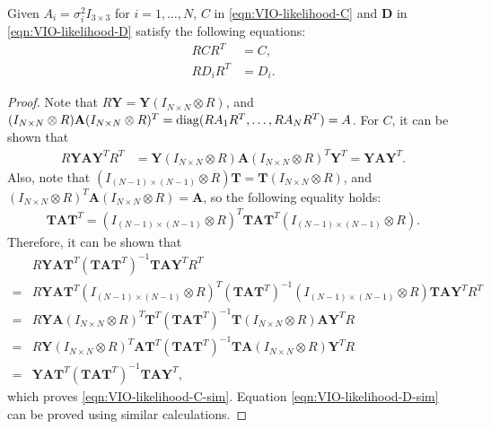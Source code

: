 \begin{lemma} \label{lemma:VIO-likelihood-CD}
	Given $A_i = \sigma_i^2I_{3\times 3}$ for $i=1,\ldots,N$, $C$ in \eqref{eqn:VIO-likelihood-C} and $\mathbf{D}$ in \eqref{eqn:VIO-likelihood-D} satisfy the following equations:
	\begin{align}
		RCR^T &= C, \label{eqn:VIO-likelihood-C-sim} \\
		RD_iR^T &= D_i. \label{eqn:VIO-likelihood-D-sim}
	\end{align}
\end{lemma}
\begin{proof}
	Note that $R\mathbf{Y} = \mathbf{Y}(I_{N\times N}\otimes R)$, and $(I_{N\times N}\otimes R) \mathbf{A} (I_{N\times N}\otimes R)^T = \mathrm{diag}(RA_1R^T,\allowbreak \ldots,\allowbreak RA_NR^T) = A$.
	For $C$, it can be shown that
	\begin{align*}
		R\mathbf{YAY}^TR^T &= \mathbf{Y} (I_{N\times N}\otimes R) \mathbf{A} (I_{N\times N}\otimes R)^T \mathbf{Y}^T = \mathbf{YAY}^T.
	\end{align*}
	Also, note that $\left(I_{(N-1)\times (N-1)}\otimes R\right) \mathbf{T} = \mathbf{T} (I_{N\times N}\otimes R)$, and $(I_{N\times N}\otimes R)^T \mathbf{A} (I_{N\times N}\otimes R) = \mathbf{A}$, so the following equality holds:
	\begin{align*}
		\mathbf{TAT}^T = \left(I_{(N-1)\times (N-1)}\otimes R\right)^T \mathbf{TAT}^T \left(I_{(N-1)\times (N-1)}\otimes R\right).
	\end{align*}
	Therefore, it can be shown that
	\begin{align*}
		&R\mathbf{Y}\mathbf{A}\mathbf{T}^T (\mathbf{T}\mathbf{A}\mathbf{T}^T)^{-1} \mathbf{T}\mathbf{A}\mathbf{Y}^TR^T \\
		= &R\mathbf{Y} \mathbf{AT}^T \left(I_{(N-1)\times (N-1)}\otimes R\right)^T (\mathbf{TAT}^T)^{-1} \left(I_{(N-1)\times (N-1)}\otimes R\right) \mathbf{TA} \mathbf{Y}^T R^T \\
		= &R\mathbf{YA} (I_{N\times N}\otimes R)^T \mathbf{T}^T (\mathbf{TAT}^T)^{-1} \mathbf{T} (I_{N\times N}\otimes R) \mathbf{AY}^T R \\
		= &R\mathbf{Y} (I_{N\times N}\otimes R)^T \mathbf{AT}^T (\mathbf{TAT}^T)^{-1} \mathbf{TA} (I_{N\times N}\otimes R) \mathbf{Y}^T R \\
		= &\mathbf{Y}\mathbf{A}\mathbf{T}^T (\mathbf{T}\mathbf{A}\mathbf{T}^T)^{-1} \mathbf{T}\mathbf{A}\mathbf{Y}^T,
	\end{align*}
	which proves \eqref{eqn:VIO-likelihood-C-sim}.
	Equation \eqref{eqn:VIO-likelihood-D-sim} can be proved using similar calculations.
\end{proof}

